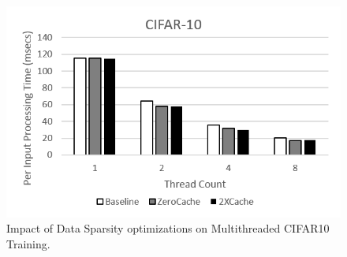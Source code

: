 \begin{figure}
 \centering
 \includegraphics[width=.95\columnwidth]{Figures/cifar-10_zerocache.png}
\caption{Impact of Data Sparsity optimizations on Multithreaded CIFAR10 Training.}
 \label{fig:cifar10_zerocache}
 \end{figure}

